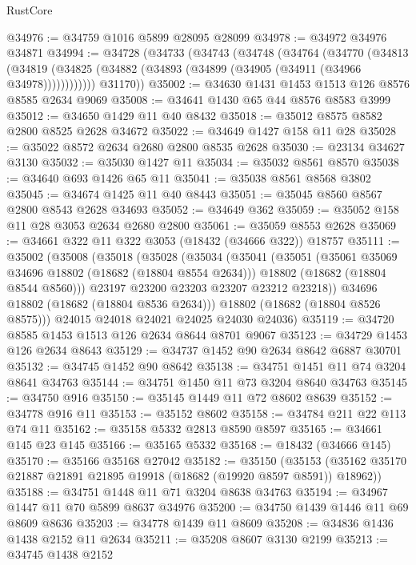 \begin{lexlean}{RustCore}
\begin{coremodule}
@34976 := @34759 @1016 @5899 @28095 @28099
@34978 := @34972 @34976 @34871
@34994 := @34728
    (@34733
      (@34743
        (@34748
          (@34764
            (@34770
              (@34813
                (@34819 (@34825 (@34882 (@34893 (@34899 (@34905 (@34911 (@34966 @34978))))))))))))
        @31170))
@35002 := @34630 @1431 @1453 @1513 @126 @8576 @8585 @2634 @9069
@35008 := @34641 @1430 @65 @44 @8576 @8583 @3999
@35012 := @34650 @1429 @11 @40 @8432
@35018 := @35012 @8575 @8582 @2800 @8525 @2628 @34672
@35022 := @34649 @1427 @158 @11 @28
@35028 := @35022 @8572 @2634 @2680 @2800 @8535 @2628
@35030 := @23134 @34627 @3130
@35032 := @35030 @1427 @11
@35034 := @35032 @8561 @8570
@35038 := @34640 @693 @1426 @65 @11
@35041 := @35038 @8561 @8568 @3802
@35045 := @34674 @1425 @11 @40 @8443
@35051 := @35045 @8560 @8567 @2800 @8543 @2628 @34693
@35052 := @34649 @362
@35059 := @35052 @158 @11 @28 @3053 @2634 @2680 @2800
@35061 := @35059 @8553 @2628
@35069 := @34661 @322 @11 @322 @3053 (@18432 (@34666 @322)) @18757
@35111 := @35002
    (@35008
      (@35018
        (@35028
          (@35034
            (@35041
              (@35051
                (@35061 @35069 @34696 @18802 (@18682 (@18804 @8554 @2634)))
                @18802
                (@18682 (@18804 @8544 @8560)))
              @23197
              @23200
              @23203
              @23207
              @23212
              @23218))
          @34696
          @18802
          (@18682 (@18804 @8536 @2634)))
        @18802
        (@18682 (@18804 @8526 @8575)))
      @24015
      @24018
      @24021
      @24025
      @24030
      @24036)
@35119 := @34720 @8585 @1453 @1513 @126 @2634 @8644 @8701 @9067
@35123 := @34729 @1453 @126 @2634 @8643
@35129 := @34737 @1452 @90 @2634 @8642 @6887 @30701
@35132 := @34745 @1452 @90 @8642
@35138 := @34751 @1451 @11 @74 @3204 @8641 @34763
@35144 := @34751 @1450 @11 @73 @3204 @8640 @34763
@35145 := @34750 @916
@35150 := @35145 @1449 @11 @72 @8602 @8639
@35152 := @34778 @916 @11
@35153 := @35152 @8602
@35158 := @34784 @211 @22 @113 @74 @11
@35162 := @35158 @5332 @2813 @8590 @8597
@35165 := @34661 @145 @23 @145
@35166 := @35165 @5332
@35168 := @18432 (@34666 @145)
@35170 := @35166 @35168 @27042
@35182 := @35150
    (@35153 (@35162 @35170 @21887 @21891 @21895 @19918 (@18682 (@19920 @8597 @8591)) @18962))
@35188 := @34751 @1448 @11 @71 @3204 @8638 @34763
@35194 := @34967 @1447 @11 @70 @5899 @8637 @34976
@35200 := @34750 @1439 @1446 @11 @69 @8609 @8636
@35203 := @34778 @1439 @11 @8609
@35208 := @34836 @1436 @1438 @2152 @11 @2634
@35211 := @35208 @8607 @3130 @2199
@35213 := @34745 @1438 @2152

\end{coremodule}
\end{lexlean}
